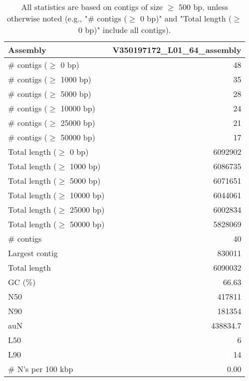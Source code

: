 \documentclass[12pt,a4paper]{article}
\begin{document}
\begin{table}[ht]
\begin{center}
\caption{All statistics are based on contigs of size $\geq$ 500 bp, unless otherwise noted (e.g., "\# contigs ($\geq$ 0 bp)" and "Total length ($\geq$ 0 bp)" include all contigs).}
\begin{tabular}{|l*{1}{|r}|}
\hline
Assembly & V350197172\_L01\_64\_assembly \\ \hline
\# contigs ($\geq$ 0 bp) & 48 \\ \hline
\# contigs ($\geq$ 1000 bp) & 35 \\ \hline
\# contigs ($\geq$ 5000 bp) & 28 \\ \hline
\# contigs ($\geq$ 10000 bp) & 24 \\ \hline
\# contigs ($\geq$ 25000 bp) & 21 \\ \hline
\# contigs ($\geq$ 50000 bp) & 17 \\ \hline
Total length ($\geq$ 0 bp) & 6092902 \\ \hline
Total length ($\geq$ 1000 bp) & 6086735 \\ \hline
Total length ($\geq$ 5000 bp) & 6071651 \\ \hline
Total length ($\geq$ 10000 bp) & 6044061 \\ \hline
Total length ($\geq$ 25000 bp) & 6002834 \\ \hline
Total length ($\geq$ 50000 bp) & 5828069 \\ \hline
\# contigs & 40 \\ \hline
Largest contig & 830011 \\ \hline
Total length & 6090032 \\ \hline
GC (\%) & 66.63 \\ \hline
N50 & 417811 \\ \hline
N90 & 181354 \\ \hline
auN & 438834.7 \\ \hline
L50 & 6 \\ \hline
L90 & 14 \\ \hline
\# N's per 100 kbp & 0.00 \\ \hline
\end{tabular}
\end{center}
\end{table}
\end{document}
